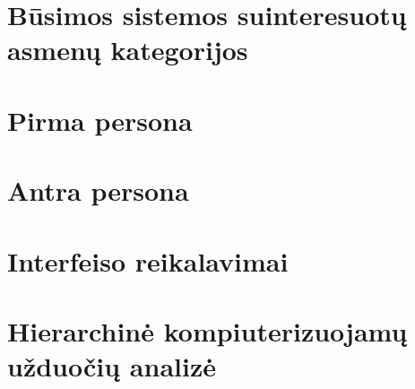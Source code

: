   

  \section{Būsimos sistemos suinteresuotų asmenų kategorijos}
  

  \newpage
  \section{Pirma persona}
  

  \newpage
  \section{Antra persona}
  

  \newpage
  \section{Interfeiso reikalavimai}
  

  \newpage
  \section{Hierarchinė kompiuterizuojamų užduočių analizė}
  
